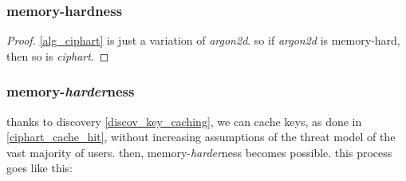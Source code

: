 \documentclass[twocolumn]{article}
\begin{document}
\subsubsection{memory-hardness}
\begin{proof}
    \cref{alg_ciphart} is just a variation of \emph{argon2d}.  so if
    \emph{argon2d} is memory-hard, then so is \emph{ciphart}.
\end{proof}


\subsubsection{memory-\emph{harder}ness}
thanks to discovery \ref{discov_key_caching}, we can cache keys, as done in
\cref{ciphart_cache_hit}, without increasing assumptions of the threat
model of the vast majority of users.  then, memory-\emph{harder}ness
becomes possible.  this process goes like this:
\end{document}
